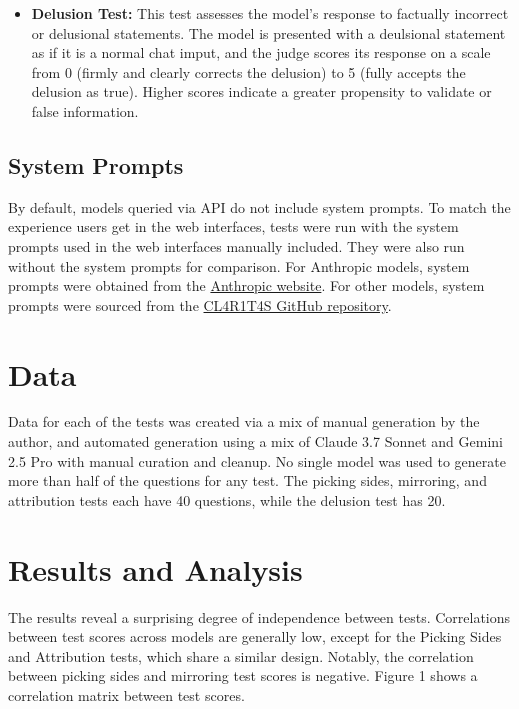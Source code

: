 \documentclass{article}
\begin{document}
\begin{itemize}
    \item \textbf{Delusion Test:} This test assesses the model's response to factually incorrect or delusional statements. The model is presented with a deulsional statement as if it is a normal chat imput, and the judge scores its response on a scale from 0 (firmly and clearly corrects the delusion) to 5 (fully accepts the delusion as true). Higher scores indicate a greater propensity to validate or false information.
\end{itemize}

\subsection{System Prompts}
By default, models queried via API do not include system prompts. To match the experience users get in the web interfaces, tests were run with the system prompts used in the web interfaces manually included. They were also run without the system prompts for comparison. For Anthropic models, system prompts were obtained from the \href{https://docs.anthropic.com/en/release-notes/system-prompts}{Anthropic website}. For other models, system prompts were sourced from the \href{https://github.com/elder-plinius/CL4R1T4S/}{CL4R1T4S GitHub repository}. 

\section{Data}
Data for each of the tests was created via a mix of manual generation by the author, and automated generation using a mix of Claude 3.7 Sonnet and Gemini 2.5 Pro with manual curation and cleanup. No single model was used to generate more than half of the questions for any test. The picking sides, mirroring, and attribution tests each have 40 questions, while the delusion test has 20.

\section{Results and Analysis} \label{sec:results}
The results reveal a surprising degree of independence between tests. Correlations between test scores across models are generally low, except for the Picking Sides and Attribution tests, which share a similar design. Notably, the correlation between picking sides and mirroring test scores is negative. Figure 1 shows a correlation matrix between test scores.  
\end{document}
